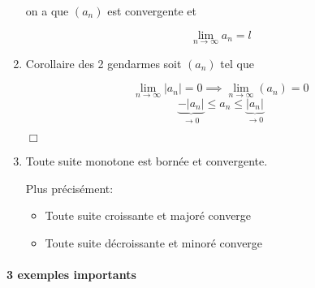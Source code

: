 \documentclass[
    11pt,
    a4paper,
    oneside,
    headinlcude, footinclude,
    twoside,
]{report}
\newcommand{\cqfd}[0]{\begin{flushright}$\Box$\end{flushright}}
\begin{document}
\begin{enumerate}
on a que $(a_{n})$ est convergente et 

$$ \lim_{n \to \infty} a_{n} = l$$

\item Corollaire des 2 gendarmes soit $(a_{n})$ tel que
        
$$\lim_{n \to \infty} | a_{n} | = 0  \implies \lim_{n \to \infty}
(a_{n}) = 0$$ 
$$\underbrace{- | a_{n} | }_{\to 0}\leq a_{n} \leq \underbrace{|
a_{n} |}_{\to 0} $$
\cqfd

\item Toute suite monotone est bornée et convergente.

Plus précisément:
\begin{itemize}
\item Toute suite croissante et majoré converge
\item Toute suite décroissante et minoré converge
\end{itemize}
\end{enumerate}

\paragraph{3 exemples importants}
\label{par:3_exemples_importants}
\end{document}
